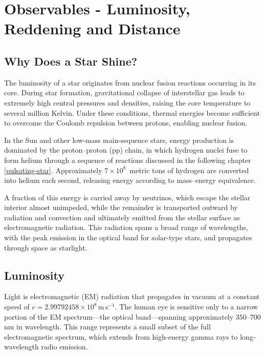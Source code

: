
\chapter{Observables - Luminosity, Reddening and Distance}


\section{Why Does a Star Shine?}

The luminosity of a star originates from nuclear fusion reactions occurring in its core. During star formation, gravitational collapse of interstellar gas leads to extremely high central pressures and densities, raising the core temperature to several million Kelvin. Under these conditions, thermal energies become sufficient to overcome the Coulomb repulsion between protons, enabling nuclear fusion.

In the Sun and other low-mass main-sequence stars, energy production is dominated by the proton--proton (pp) chain, in which hydrogen nuclei fuse to form helium through a sequence of reactions discussed in the following chapter \ref{pulsating-star}. Approximately $7 \times 10^{8}$~metric tons of hydrogen are converted into helium each second, releasing energy according to mass--energy equivalence.

A fraction of this energy is carried away by neutrinos, which escape the stellar interior almost unimpeded, while the remainder is transported outward by radiation and convection and ultimately emitted from the stellar surface as electromagnetic radiation. This radiation spans a broad range of wavelengths, with the peak emission in the optical band for solar-type stars, and propagates through space as starlight.


\section{Luminosity}

Light is electromagnetic (EM) radiation that propagates in vacuum at a constant speed of
$c = 2.99792458 \times 10^{8}\,\mathrm{m\,s^{-1}}$. The human eye is sensitive only to a narrow portion of the EM spectrum—the optical band—spanning approximately $350$--$700$ nm in wavelength. This range represents a small subset of the full electromagnetic spectrum, which extends from high-energy gamma rays to long-wavelength radio emission.

